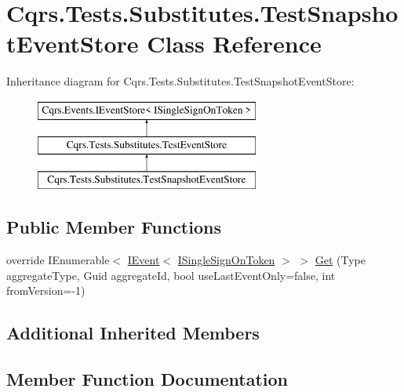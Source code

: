 \hypertarget{classCqrs_1_1Tests_1_1Substitutes_1_1TestSnapshotEventStore}{}\section{Cqrs.\+Tests.\+Substitutes.\+Test\+Snapshot\+Event\+Store Class Reference}
\label{classCqrs_1_1Tests_1_1Substitutes_1_1TestSnapshotEventStore}
Inheritance diagram for Cqrs.\+Tests.\+Substitutes.\+Test\+Snapshot\+Event\+Store\+:\begin{figure}[H]
\begin{center}
\leavevmode
\includegraphics[height=3.000000cm]{classCqrs_1_1Tests_1_1Substitutes_1_1TestSnapshotEventStore}
\end{center}
\end{figure}
\subsection*{Public Member Functions}
\begin{DoxyCompactItemize}
\item 
override I\+Enumerable$<$ \hyperlink{interfaceCqrs_1_1Events_1_1IEvent}{I\+Event}$<$ \hyperlink{interfaceCqrs_1_1Authentication_1_1ISingleSignOnToken}{I\+Single\+Sign\+On\+Token} $>$ $>$ \hyperlink{classCqrs_1_1Tests_1_1Substitutes_1_1TestSnapshotEventStore_a7acb01defa795be81fc14a19ae703970_a7acb01defa795be81fc14a19ae703970}{Get} (Type aggregate\+Type, Guid aggregate\+Id, bool use\+Last\+Event\+Only=false, int from\+Version=-\/1)
\end{DoxyCompactItemize}
\subsection*{Additional Inherited Members}


\subsection{Member Function Documentation}
\mbox{\label{classCqrs_1_1Tests_1_1Substitutes_1_1TestSnapshotEventStore_a7acb01defa795be81fc14a19ae703970_a7acb01defa795be81fc14a19ae703970}} 
